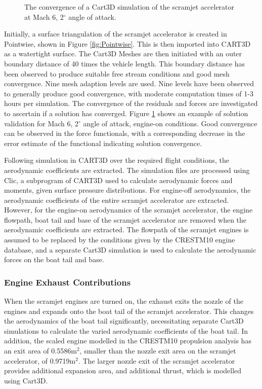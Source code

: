 \begin{figure}[ht]
\begin{subfigure}{.5\textwidth}
	\end{subfigure}
	
	\caption{The convergence of a Cart3D simulation of the scramjet accelerator at Mach 6, 2$^\circ$ angle of attack.}
	\label{fig:Cart3dValidation}
\end{figure}

Initially, a surface triangulation of the scramjet accelerator is created in Pointwise, shown in Figure \ref{fig:Pointwise}. This is then imported into CART3D as a watertight surface. 
The Cart3D Meshes are then initiated with an outer boundary distance of 40 times the vehicle length. This boundary distance has been observed to produce suitable free stream conditions and good mesh convergence. Nine mesh adaption levels are used. Nine levels have been observed to generally produce good convergence, with moderate computation times of 1-3 hours per simulation. The convergence of the residuals and forces are investigated to ascertain if a solution has converged. Figure \ref{fig:Cart3dValidation} shows an example of solution validation for Mach 6, 2$^\circ$ angle of attack, engine-on conditions. Good convergence can be observed in the force functionals, with a corresponding decrease in the error estimate of the functional indicating solution convergence.  

Following simulation in CART3D over the required flight conditions, the aerodynamic coefficients are extracted. The simulation files are processed using Clic, a subprogram of CART3D used to calculate aerodynamic forces and moments, given surface pressure distributions. 
For engine-off aerodynamics, the aerodynamic coefficients of the entire scramjet accelerator are extracted. However, for the engine-on aerodynamics of the scramjet accelerator, the engine flowpath, boat tail and base of the scramjet accelerator are removed when the aerodynamic coefficients are extracted. The flowpath of the scramjet engines is assumed to be replaced by the conditions given by the \textsf{CRESTM10} engine database, and a separate Cart3D simulation is used to calculate the aerodynamic forces on the boat tail and base. 



\subsubsection{Engine Exhaust Contributions}\label{sec:engine-oncart}

When the scramjet engines are turned on, the exhaust exits the nozzle of the engines and expands onto the boat tail of the scramjet accelerator. This changes the aerodynamics of the boat tail significantly, necessitating separate Cart3D simulations to calculate the varied aerodynamic coefficients of the boat tail. In addition, 
the scaled engine modelled in the \textsf{CRESTM10} propulsion analysis has an exit area of 0.5586m$^2$, smaller than the nozzle exit area on the scramjet accelerator, of 0.9719m$^2$. The larger nozzle exit of the scramjet accelerator provides additional expansion area, and additional thrust, which is modelled using Cart3D. 

